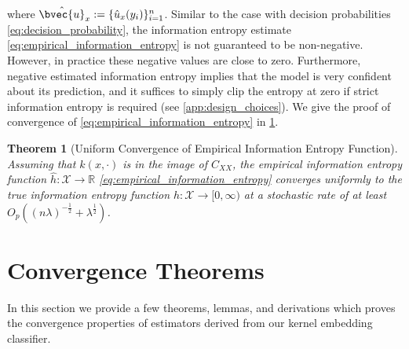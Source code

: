 \documentclass{article}
\newtheorem{theorem}{Theorem}[section]
\begin{document}
	where $\hat{\bvec{u}}_{x} := \{\hat{u}_{x}(y_{i})\}_{i = 1}^{n}$. Similar to the case with decision probabilities \eqref{eq:decision_probability}, the information entropy estimate \eqref{eq:empirical_information_entropy} is not guaranteed to be non-negative. However, in practice these negative values are close to zero. Furthermore, negative estimated information entropy implies that the model is very confident about its prediction, and it suffices to simply clip the entropy at zero if strict information entropy is required (see \cref{app:design_choices}). We give the proof of convergence of \eqref{eq:empirical_information_entropy} in \cref{app:convergence_theorems}.
	\begin{theorem}[Uniform Convergence of Empirical Information Entropy Function]
		\label{thm:entropy_convergence_copy}
		Assuming that $k(x, \cdot)$ is in the image of $C_{XX}$, the empirical information entropy function $\hat{h} : \mathcal{X} \to \mathbb{R}$ \eqref{eq:empirical_information_entropy} converges uniformly to the true information entropy function $h : \mathcal{X} \to [0, \infty)$ at a stochastic rate of at least $O_{p}((n \lambda)^{-\frac{1}{2}} + \lambda^{\frac{1}{2}})$.
	\end{theorem}
	
\section{Convergence Theorems}
\label{app:convergence_theorems}

	In this section we provide a few theorems, lemmas, and derivations which proves the convergence properties of estimators derived from our kernel embedding classifier.
	
\end{document}
